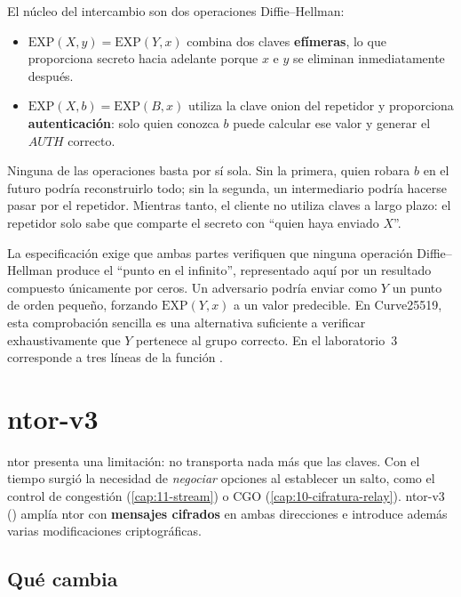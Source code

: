 El núcleo del intercambio son dos operaciones Diffie--Hellman:
\begin{itemize}
  \item $\mathrm{EXP}(X,y) = \mathrm{EXP}(Y,x)$ combina dos claves \textbf{efímeras}, lo que proporciona secreto hacia adelante porque $x$ e $y$ se eliminan inmediatamente después.
  \item $\mathrm{EXP}(X,b) = \mathrm{EXP}(B,x)$ utiliza la clave onion del repetidor y proporciona \textbf{autenticación}: solo quien conozca $b$ puede calcular ese valor y generar el $\mathit{AUTH}$ correcto.
\end{itemize}

Ninguna de las operaciones basta por sí sola. Sin la primera, quien robara $b$ en el futuro podría reconstruirlo todo; sin la segunda, un intermediario podría hacerse pasar por el repetidor. Mientras tanto, el cliente no utiliza claves a largo plazo: el repetidor solo sabe que comparte el secreto con \enquote{quien haya enviado $X$}.

\begin{approfondimento}
La especificación exige que ambas partes verifiquen que ninguna operación Diffie--Hellman produce el \enquote{punto en el infinito}, representado aquí por un resultado compuesto únicamente por ceros. Un adversario podría enviar como $Y$ un punto de orden pequeño, forzando $\mathrm{EXP}(Y,x)$ a un valor predecible. En Curve25519, esta comprobación sencilla es una alternativa suficiente a verificar exhaustivamente que $Y$ pertenece al grupo correcto. En el laboratorio~3 corresponde a tres líneas de la función .
\end{approfondimento}

\section{ntor-v3}\label{sec:ntor3}

ntor presenta una limitación: no transporta nada más que las claves. Con el tiempo surgió la necesidad de \emph{negociar} opciones al establecer un salto, como el control de congestión (\cref{cap:11-stream}) o CGO (\cref{cap:10-cifratura-relay}). ntor-v3 () amplía ntor con \textbf{mensajes cifrados} en ambas direcciones e introduce además varias modificaciones criptográficas.

\subsection{Qué cambia}

